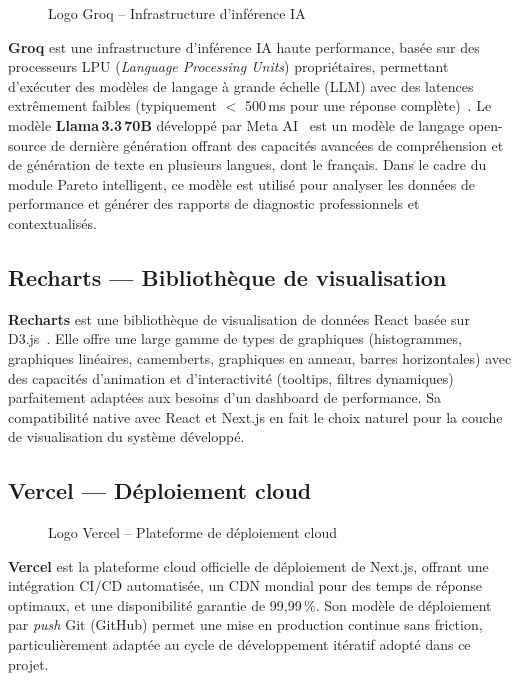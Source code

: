 \documentclass[10pt,a4paper]{report}
\begin{document}
\begin{figure}[H]
\centering
\caption{Logo Groq -- Infrastructure d'inférence IA}
\label{fig:groq-logo}
\end{figure}

\textbf{Groq} est une infrastructure d'inférence IA haute performance, basée sur des processeurs LPU (\textit{Language Processing Units}) propriétaires, permettant d'exécuter des modèles de langage à grande échelle (LLM) avec des latences extrêmement faibles (typiquement $<$ 500\,ms pour une réponse complète)~\cite{groq2025}. Le modèle \textbf{Llama\,3.3\,70B} développé par Meta AI~\cite{meta2024} est un modèle de langage open-source de dernière génération offrant des capacités avancées de compréhension et de génération de texte en plusieurs langues, dont le français. Dans le cadre du module Pareto intelligent, ce modèle est utilisé pour analyser les données de performance et générer des rapports de diagnostic professionnels et contextualisés.

\subsection{Recharts --- Bibliothèque de visualisation}

\textbf{Recharts} est une bibliothèque de visualisation de données React basée sur D3.js~\cite{recharts2025}. Elle offre une large gamme de types de graphiques (histogrammes, graphiques linéaires, camemberts, graphiques en anneau, barres horizontales) avec des capacités d'animation et d'interactivité (tooltips, filtres dynamiques) parfaitement adaptées aux besoins d'un dashboard de performance. Sa compatibilité native avec React et Next.js en fait le choix naturel pour la couche de visualisation du système développé.

\subsection{Vercel --- Déploiement cloud}

\begin{figure}[H]
\centering
\caption{Logo Vercel -- Plateforme de déploiement cloud}
\label{fig:vercel-logo}
\end{figure}

\textbf{Vercel} est la plateforme cloud officielle de déploiement de Next.js, offrant une intégration CI/CD automatisée, un CDN mondial pour des temps de réponse optimaux, et une disponibilité garantie de 99,99\,\%. Son modèle de déploiement par \textit{push} Git (GitHub) permet une mise en production continue sans friction, particulièrement adaptée au cycle de développement itératif adopté dans ce projet.
\end{document}
